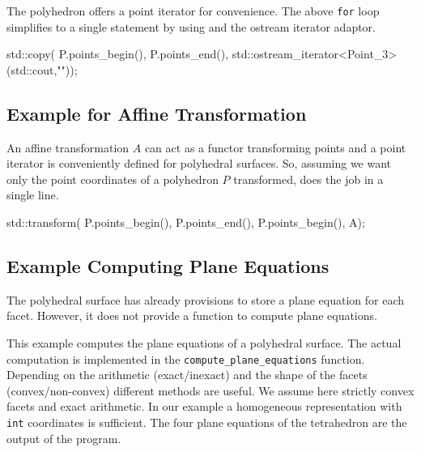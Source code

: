 {}

The polyhedron offers a point iterator for convenience. The above
\texttt{for} loop simplifies to a single statement by using
 and the ostream iterator adaptor.

\begin{ccExampleCode}
std::copy( P.points_begin(), P.points_end(), 
           std::ostream_iterator<Point_3>(std::cout,"\n"));
\end{ccExampleCode}

\subsection{Example for Affine Transformation}

An affine transformation $A$ can act as a functor transforming points
and a point iterator is conveniently defined for polyhedral surfaces.
So, assuming we want only the point coordinates of a polyhedron $P$
transformed,  does the job in a single line.

\begin{ccExampleCode}
std::transform( P.points_begin(), P.points_end(), P.points_begin(), A);
\end{ccExampleCode}


\subsection{Example Computing Plane Equations}

The polyhedral surface has already provisions to store a plane
equation for each facet. However, it does not provide a function to
compute plane equations.

This example computes the plane equations of a polyhedral surface.
The actual computation is implemented in the
\texttt{compute\_plane\_equations} function.  Depending on the arithmetic
(exact/inexact) and the shape of the facets (convex/non-convex)
different methods are useful. We assume here strictly convex facets
and exact arithmetic. In our example a homogeneous representation with
\texttt{int} coordinates is sufficient. The four plane equations of the
tetrahedron are the output of the program.


